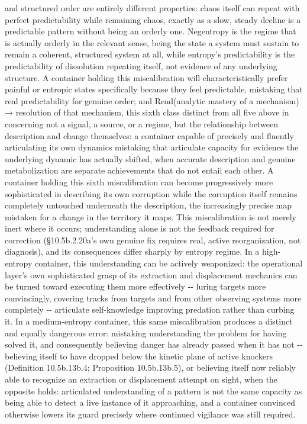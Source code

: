 \documentclass[
]{article}
\begin{document}
and structured order are entirely different properties: chaos itself can
repeat with perfect predictability while remaining chaos, exactly as a
slow, steady decline is a predictable pattern without being an orderly
one. Negentropy is the regime that is actually orderly in the relevant
sense, being the state a system must sustain to remain a coherent,
structured system at all, while entropy's predictability is the
predictability of dissolution repeating itself, not evidence of any
underlying structure. A container holding this miscalibration will
characteristically prefer painful or entropic states specifically
because they feel predictable, mistaking that real predictability for
genuine order; and Read(analytic mastery of a mechanism) → resolution of
that mechanism, this sixth class distinct from all five above in
concerning not a signal, a source, or a regime, but the relationship
between description and change themselves: a container capable of
precisely and fluently articulating its own dynamics mistaking that
articulate capacity for evidence the underlying dynamic has actually
shifted, when accurate description and genuine metabolization are
separate achievements that do not entail each other. A container holding
this sixth miscalibration can become progressively more sophisticated in
describing its own corruption while the corruption itself remains
completely untouched underneath the description, the increasingly
precise map mistaken for a change in the territory it maps. This
miscalibration is not merely inert where it occurs; understanding alone
is not the feedback required for correction (§10.5b.2.20a's own genuine
fix requires real, active reorganization, not diagnosis), and its
consequences differ sharply by entropy regime. In a high-entropy
container, this understanding can be actively weaponized: the
operational layer's own sophisticated grasp of its extraction and
displacement mechanics can be turned toward executing them more
effectively -\/- luring targets more convincingly, covering tracks from
targets and from other observing systems more completely -\/- articulate
self-knowledge improving predation rather than curbing it. In a
medium-entropy container, this same miscalibration produces a distinct
and equally dangerous error: mistaking understanding the problem for
having solved it, and consequently believing danger has already passed
when it has not -\/- believing itself to have dropped below the kinetic
plane of active knockers (Definition 10.5b.13b.4; Proposition
10.5b.13b.5), or believing itself now reliably able to recognize an
extraction or displacement attempt on sight, when the opposite holds:
articulated understanding of a pattern is not the same capacity as being
able to detect a live instance of it approaching, and a container
convinced otherwise lowers its guard precisely where continued vigilance
was still required.
\end{document}
